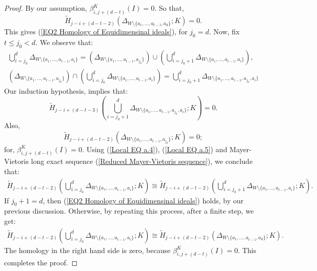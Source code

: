 \documentclass[a4paper,11pt]{amsart}
\theoremstyle{plain}
\theoremstyle{definition}
\theoremstyle{remark}
\begin{document}
\begin{proof}
	By our assumption, $\beta^K_{i,j+(d-t)}(I)=0$. So that,
	\begin{equation*} 
	\tilde{H}_{j-i+(d-t-2)} \left( \Delta_{W \setminus \{a_1, \ldots, a_{t-1}, a_d\}} ;K \right) =0.
	\end{equation*}
	This gives (\ref{EQ2 Homology of Equidimensinal ideals}), for $j_0=d$. Now, fix $t \leq j_0 <d$. We observe that:
	\begin{align}
	\bigcup\limits_{i={j_0}}^{d} \Delta_{W \setminus \{a_1, \ldots, a_{t-1}, a_i\}} = \left( \Delta_{W \setminus \{a_1, \ldots, a_{t-1}, a_{j_0}\}} \right) \cup \left( \bigcup\limits_{i={j_0+1}}^{d} \Delta_{W \setminus \{a_1, \ldots, a_{t-1}, a_i\}} \right), \nonumber\\
	\left( \Delta_{W \setminus \{a_1, \ldots, a_{t-1}, a_{j_0}\}} \right) \cap \left( \bigcup\limits_{i={j_0}}^{d} \Delta_{W \setminus \{a_1, \ldots, a_{t-1}, a_i\}} \right) = \bigcup\limits_{i={j_0}+1}^{d} \Delta_{W \setminus \{a_1, \ldots, a_{t-1}, a_{j_0}, a_i\}} \nonumber
	\end{align}
	Our induction hypothesis, implies that:
	\begin{equation} \label{Local EQ a.4}
	\tilde{H}_{j-i+(d-t-3)} \left( \bigcup\limits_{i={j_0}+1}^{d} \Delta_{W \setminus \{a_1, \ldots, a_{t-1}, a_{j_0}, a_i\}}; K \right) =0.
	\end{equation}
	Also, 
	\begin{equation} \label{Local EQ a.5}
	\tilde{H}_{j-i+(d-t-2)} \left( \Delta_{W \setminus \{a_1, \ldots, a_{t-1}, a_{j_0}\}}; K \right) =0;
	\end{equation}
	for, $\beta^K_{i, j+(d-t)}(I) =0$. Using (\ref{Local EQ a.4}), (\ref{Local EQ a.5}) and Mayer-Vietoris long exact sequence (\ref{Reduced Mayer-Vietoris sequence}), we conclude that:
	\begin{align*}
	\tilde{H}_{j-i+(d-t-2)} \left( \bigcup\limits_{i={j_0}}^{d} \Delta_{W \setminus \{a_1, \ldots, a_{t-1}, a_i\}} ;K \right) \cong \tilde{H}_{j-i+(d-t-2)} \left( \bigcup\limits_{i={j_0}+1}^{d} \Delta_{W \setminus \{a_1, \ldots, a_{t-1}, a_i\}} ;K \right).
	\end{align*}
	If $j_0+1=d$, then (\ref{EQ2 Homology of Equidimensinal ideals}) holds, by our previous discussion. Otherwise, by repeating this process, after a finite step, we get:
	\begin{align*}
	\tilde{H}_{j-i+(d-t-2)} \left( \bigcup\limits_{i={j_0}}^{d} \Delta_{W \setminus \{a_1, \ldots, a_{t-1}, a_i\}} ;K \right) \cong \tilde{H}_{j-i+(d-t-2)} \left(\Delta_{W \setminus \{a_1, \ldots, a_{t-1}, a_d\}} ;K \right).
	\end{align*}
	The homology in the right hand side is zero, because $\beta^K_{i, j+(d-t)}(I)=0$. This completes the proof.
\end{proof}
\end{document}
